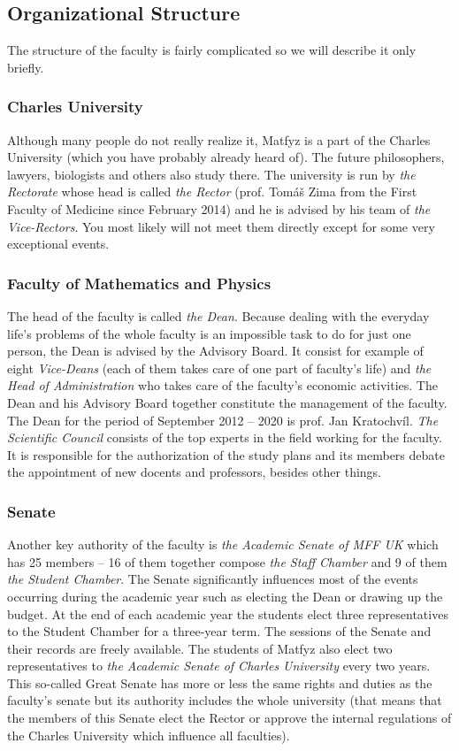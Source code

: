 \subsection{Organizational Structure}

The structure of the faculty is fairly complicated so we will describe it only
briefly.


\subsubsection{Charles University}
Although many people do not really realize it, Matfyz is a part of the Charles
University (which you have probably already heard of). The future philosophers,
lawyers, biologists and others also study there. The university is run by
\textit{the Rectorate} whose head is called \textit{the Rector} (prof. Tomáš
Zima from the First Faculty of Medicine since February 2014) and he is advised
by his team of \textit{the Vice-Rectors}. You most likely will not meet them
directly except for some very exceptional events.


\subsubsection{Faculty of Mathematics and Physics}
The head of the faculty is called \textit{the Dean}.
Because dealing with the everyday life's problems of the whole faculty is an
impossible task to do for just one person, the Dean is advised by the Advisory
Board.
It consist for example of eight \textit{Vice-Deans} (each of them takes care of
one part of faculty's life) and \textit{the Head of Administration} who takes
care of the faculty's economic activities.
The Dean and his Advisory Board together constitute the management of the
faculty. The Dean for the period of September 2012 – 2020 is prof. Jan
Kratochvíl.
\textit{The Scientific Council} consists of the top experts in the field working
for the faculty. It is responsible for the authorization of the study plans and
its members debate the appointment of new docents and professors, besides other
things.


\subsubsection{Senate}
Another key authority of the faculty is \textit{the Academic Senate of MFF UK}
which has 25 members – 16 of them together compose \textit{the Staff Chamber}
and 9 of them \textit{the Student Chamber}.
The Senate significantly influences most of the events occurring during the
academic year such as electing the Dean or drawing up the budget.
At the end of each academic year the students elect three representatives to the
Student Chamber for a three-year term. The sessions of the Senate and their
records are freely available.
The students of Matfyz also elect two representatives to \textit{the Academic
Senate of Charles University} every two years.
This so-called Great Senate has more or less the same rights and duties as the
faculty's senate but its authority includes the whole university (that means
that the members of this Senate elect the Rector or approve the internal
regulations of the Charles University which influence all faculties).


